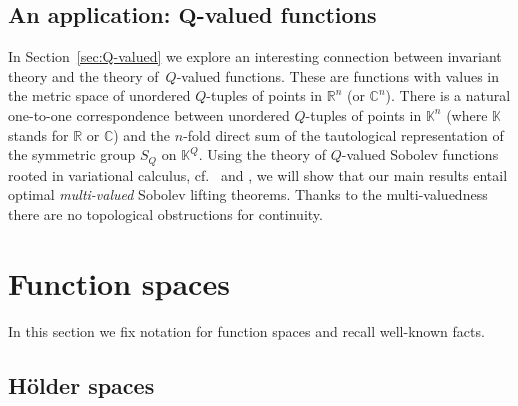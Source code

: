 \documentclass[pdftex]{sigma}
\numberwithin{equation}{section}
\def\C{\mathbb{C}}
\def\K{\mathbb{K}}
\def\R{\mathbb{R}}
\begin{document}
\subsection[An application: Q-valued functions]{An application: ${\boldsymbol Q}$-valued functions}

In Section~\ref{sec:Q-valued} we explore an interesting connection between invariant theory and the theory of~$Q$-valued functions. These are functions with values in the metric space of unordered $Q$-tuples of points in
$\R^n$ (or $\C^n$). There is a natural one-to-one correspondence between unordered $Q$-tuples of points in
$\K^n$ (where $\K$ stands for $\R$ or $\C$) and the $n$-fold direct sum of the tautological representation of the symmetric
group $S_Q$ on $\K^Q$.
Using the theory of $Q$-valued Sobolev functions rooted in variational calculus,
cf.\ \cite{Almgren00} and \cite{De-LellisSpadaro11}, we will show that our main results
entail optimal \emph{multi-valued} Sobolev lifting theorems. Thanks to the multi-valuedness there are
no topological obstructions for continuity.








\section{Function spaces}\label{functionspaces}

In this section we fix notation for function spaces and recall well-known facts.

\subsection{H\"older spaces}
\end{document}
